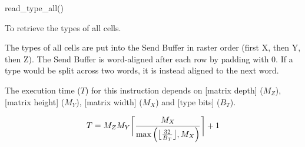 

\format

read\_type\_all()

\purpose

To retrieve the types of all cells.

\description

The types of all cells are put into the Send Buffer in raster order (first X, then Y, then Z).
The Send Buffer is word-aligned after each row by padding with 0.
If a type would be split across two words, it is instead aligned to the next word.

\notes

The execution time ($T$) for this instruction depends on [matrix depth] ($M_Z$), [matrix height] ($M_Y$), [matrix width] ($M_X$) and [type bits] ($B_T$).

$$ T = M_Z M_Y \ceil[\bigg]{ \frac{M_X}{\max \left( \floor[\big]{ \frac{32}{B_T} }, M_X \right)} } + 1 $$
